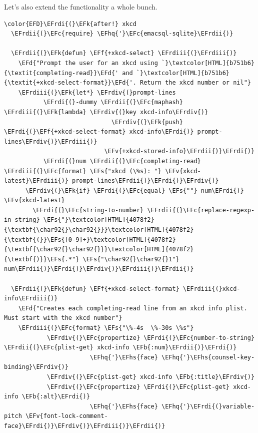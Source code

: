 \documentclass{scrartcl}
\newcommand{\EFk}[1]{\textcolor{EFk}{#1}} %
\newcommand{\EFd}[1]{\textcolor{EFd}{\textit{#1}}} %
\newcommand{\EFs}[1]{\textcolor{EFs}{#1}} %
\newcommand{\EFb}[1]{\textcolor{EFb}{#1}} %
\newcommand{\EFc}[1]{\textcolor{EFc}{#1}} %
\newcommand{\EFv}[1]{\textcolor{EFv}{#1}} %
\newcommand{\EFf}[1]{\textcolor{EFf}{#1}} %
\newcommand{\EFhq}[1]{\textcolor{EFhq}{#1}} %
\newcommand{\EFhs}[1]{\textcolor{EFhs}{#1}} %
\newcommand{\EFrdi}[1]{\textcolor{EFrdi}{#1}} %
\newcommand{\EFrdii}[1]{\textcolor{EFrdii}{#1}} %
\newcommand{\EFrdiii}[1]{\textcolor{EFrdiii}{#1}} %
\newcommand{\EFrdiv}[1]{\textcolor{EFrdiv}{#1}} %
\begin{document}
Let's also extend the functionality a whole bunch.
\begin{Code}
\begin{Verbatim}[]
\color{EFD}\EFrdi{(}\EFk{after!} xkcd
  \EFrdii{(}\EFc{require} \EFhq{'}\EFc{emacsql-sqlite}\EFrdii{)}

  \EFrdii{(}\EFk{defun} \EFf{+xkcd-select} \EFrdiii{(}\EFrdiii{)}
    \EFd{"Prompt the user for an xkcd using `}\textcolor[HTML]{b751b6}{\textit{completing-read}}\EFd{' and `}\textcolor[HTML]{b751b6}{\textit{+xkcd-select-format}}\EFd{'. Return the xkcd number or nil"}
    \EFrdiii{(}\EFk{let*} \EFrdiv{(}prompt-lines
           \EFrdi{(}-dummy \EFrdii{(}\EFc{maphash} \EFrdiii{(}\EFk{lambda} \EFrdiv{(}key xkcd-info\EFrdiv{)}
                              \EFrdiv{(}\EFk{push} \EFrdi{(}\EFf{+xkcd-select-format} xkcd-info\EFrdi{)} prompt-lines\EFrdiv{)}\EFrdiii{)}
                            \EFv{+xkcd-stored-info}\EFrdii{)}\EFrdi{)}
           \EFrdi{(}num \EFrdii{(}\EFc{completing-read} \EFrdiii{(}\EFc{format} \EFs{"xkcd (\%s): "} \EFv{xkcd-latest}\EFrdiii{)} prompt-lines\EFrdii{)}\EFrdi{)}\EFrdiv{)}
      \EFrdiv{(}\EFk{if} \EFrdi{(}\EFc{equal} \EFs{""} num\EFrdi{)} \EFv{xkcd-latest}
        \EFrdi{(}\EFc{string-to-number} \EFrdii{(}\EFc{replace-regexp-in-string} \EFs{"}\textcolor[HTML]{4078f2}{\textbf{\char92{}\char92{}}}\textcolor[HTML]{4078f2}{\textbf{(}}\EFs{[0-9]+}\textcolor[HTML]{4078f2}{\textbf{\char92{}\char92{}}}\textcolor[HTML]{4078f2}{\textbf{)}}\EFs{.*"} \EFs{"\char92{}\char92{}1"} num\EFrdii{)}\EFrdi{)}\EFrdiv{)}\EFrdiii{)}\EFrdii{)}

  \EFrdii{(}\EFk{defun} \EFf{+xkcd-select-format} \EFrdiii{(}xkcd-info\EFrdiii{)}
    \EFd{"Creates each completing-read line from an xkcd info plist. Must start with the xkcd number"}
    \EFrdiii{(}\EFc{format} \EFs{"\%-4s  \%-30s \%s"}
            \EFrdiv{(}\EFc{propertize} \EFrdi{(}\EFc{number-to-string} \EFrdii{(}\EFc{plist-get} xkcd-info \EFb{:num}\EFrdii{)}\EFrdi{)}
                        \EFhq{'}\EFhs{face} \EFhq{'}\EFhs{counsel-key-binding}\EFrdiv{)}
            \EFrdiv{(}\EFc{plist-get} xkcd-info \EFb{:title}\EFrdiv{)}
            \EFrdiv{(}\EFc{propertize} \EFrdi{(}\EFc{plist-get} xkcd-info \EFb{:alt}\EFrdi{)}
                        \EFhq{'}\EFhs{face} \EFhq{'}\EFrdi{(}variable-pitch \EFv{font-lock-comment-face}\EFrdi{)}\EFrdiv{)}\EFrdiii{)}\EFrdii{)}


\end{Verbatim}
\end{Code}
\end{document}
